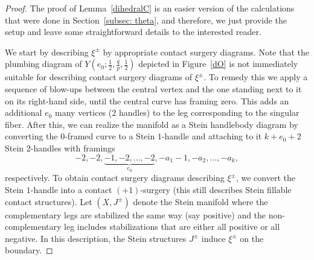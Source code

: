 \documentclass[11pt]{amsart}
\theoremstyle{plain}
\theoremstyle{definition}
\theoremstyle{remark}
\numberwithin{theorem}{section}
\begin{document}
\begin{proof} The proof of Lemma~\ref{dihedralC} is an easier version of the calculations that were done in Section~\ref{subsec: theta}, and therefore, we just provide the setup and leave some straightforward details to the interested reader. 

We start by describing $\xi^{\pm}$ by appropriate contact surgery diagrams. Note that the plumbing diagram of $Y(e_0; \frac{1}{2},  \frac{q}{p}, \frac{1}{2})$ depicted in Figure~\ref{dO}  is not immediately suitable for describing  contact surgery diagrams of $\xi^{\pm}$. To remedy this we apply a sequence of blow-ups between the central vertex and the one standing next to it on its right-hand side, until the central curve has framing zero. This adds an additional $e_0$ many vertices (2 handles) to the leg corresponding to the singular fiber. After this, we can realize the manifold as a Stein handlebody diagram by converting the 0-framed curve to a Stein $1$-handle and attaching to it $k+e_0+2$ Stein $2$-handles with framings 
\[
-2, -2, \underbrace{-1, -2, \ldots, -2}_{e_0}, -a_1-1, -a_2, \ldots, -a_k,
\] 
respectively.  To obtain contact surgery diagrams describing $\xi^{\pm}$, we convert the Stein $1$-handle into a contact $(+1)$-surgery (this still describes Stein fillable contact structures). Let $(X, J^{\pm})$ denote the Stein manifold where the complementary legs are stabilized the same way (say positive) and the non-complementary leg includes stabilizations that are either all positive or all negative. In this description, the Stein structures $J^{\pm}$ induce $\xi^{\pm}$ on the boundary. 



\end{proof}
\end{document}
